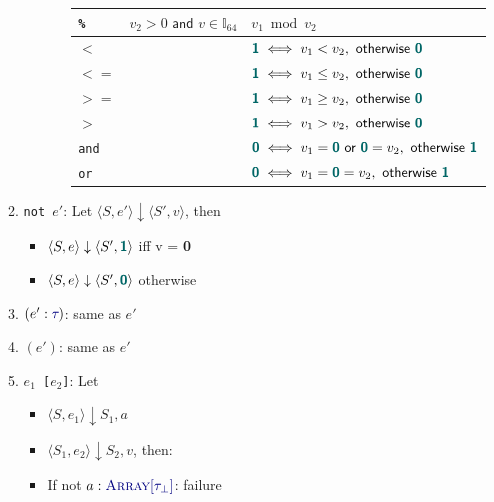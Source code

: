 \documentclass{article}
\newcommand{\tuple}[1]{\ensuremath{\langle #1 \rangle}}
\newcommand{\vterminal}[1]{\textsf{\textcolor{dgreen}{\texttt{#1}}}}
\newcommand{\Ty}[1]{\textcolor{dblue}{#1}}
\newcommand{\TArrayof}[1]{\Ty{\textsc{Array}[#1]}}
\newcommand{\Ttau}[1][{}]{\Ty{\tau_{#1}}}
\newcommand{\Vint}[1]{{\textsf{\textcolor{dcyan}{\textbf{#1}}}}}
\newcommand{\failure}{\textcolor{dred}{failure}}
\begin{document}
\begin{enumerate}
\begin{enumerate}
\begin{itemize}
\begin{enumerate}
\begin{tabular}{|l|l|l|}
              \hline
              \vterminal{\%}	& $v_2 > 0 \textsf{ and }v \in \mathbb{I}_{64}$		& $v_1 \bmod v_2$ \\
              \hline
              \vterminal{$<$}	&&$ \Vint{1} \iff v_1 < v_2, \textsf{ otherwise } \Vint{0}$ \\
              \hline
              \vterminal{$<=$}	&&$ \Vint{1} \iff v_1 \le v_2, \textsf{ otherwise } \Vint{0}$ \\
              \hline
              \vterminal{$>=$}	&&$ \Vint{1} \iff v_1 \ge v_2, \textsf{ otherwise } \Vint{0}$ \\
              \hline
              \vterminal{$>$}	&&$ \Vint{1} \iff v_1 > v_2, \textsf{ otherwise } \Vint{0}$ \\
              \hline
              \vterminal{and}	&&$ \Vint{0} \iff v_1 = \Vint{0} \textsf{ or } \Vint{0} = v_2, \textsf{ otherwise } \Vint{1}$ \\
              \hline
              \vterminal{or}	&&$ \Vint{0} \iff v_1 = \Vint{0} = v_2, \textsf{ otherwise } \Vint{1}$ \\
              \hline
            \end{tabular}
        \end{enumerate}
    \end{itemize}
  \item \vterminal{not $e'$}: Let $\tuple{S, e'} \downarrow \tuple{S', v}$, then
    \begin{itemize}
      \item $\tuple{S, e} \downarrow \tuple{S', \Vint{1}}$ iff v = \Vint{0}
      \item $\tuple{S, e} \downarrow \tuple{S', \Vint{0}}$ otherwise
    \end{itemize}
  \item \vterminal{$(e' : \Ttau)$}: same as $e'$
  \item \vterminal{$(e')$}: same as $e'$
  \item \vterminal{$e_1$ [$e_2$]}: Let
    \begin{itemize}
      \item $\tuple{S, e_1} \downarrow {S_1, a}$
      \item $\tuple{S_1, e_2} \downarrow {S_2, v}$, then:
      \item If not $a : \TArrayof{\tau_\bot}$: \failure

\end{itemize}
\end{enumerate}
\end{enumerate}
\end{document}
